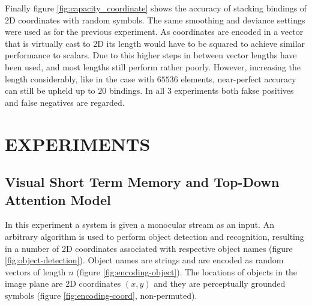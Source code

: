 \documentclass[a4paper,twoside]{article}
\begin{document}
	Finally figure \ref{fig:capacity_coordinate} shows the accuracy of stacking bindings of 2D coordinates with random symbols. The same smoothing and deviance settings were used as for the previous experiment. As coordinates are encoded in a vector that is virtually cast to 2D its length would have to be squared to achieve similar performance to scalars. Due to this higher steps in between vector lengths have been used, and most lengths still perform rather poorly. However, increasing the length considerably, like in the case with $65536$ elements, near-perfect accuracy can still be upheld up to $20$ bindings. In all $3$ experiments both fakse positives and false negatives are regarded.
		

		
	\section{EXPERIMENTS}
	\label{sec:experiments}
	\subsection{Visual Short Term Memory and Top-Down Attention Model}
	
	In this experiment a system is given a monocular stream as an input. An arbitrary algorithm is used to perform object detection and recognition, resulting in a number of 2D coordinates associated with respective object names (figure \ref{fig:object-detection}). Object names are strings and are encoded as random vectors of length $n$ (figure \ref{fig:encoding-object}). The locations of objects in the image plane are 2D coordinates $(x,y)$ and they are perceptually grounded symbols (figure \ref{fig:encoding-coord}, non-permuted).
\end{document}
